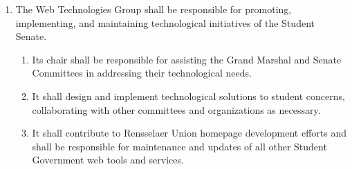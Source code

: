 \documentclass{uniondoc}
\begin{document}
\begin{enumerate}
	      \begin{enumerate}
		      \item It shall take steps to gather information on the state of quality of life, well-being, and the general campus student experience.
		            \begin{enumerate}
			            \item To this end, it shall coordinate with the Senate Communications and Engagement Committee during outreach programs to ascertain student opinions and concerns within these areas.
		            \end{enumerate}
		      \item It shall address issues pertaining to student rights and responsibilities as they arise.
		            \begin{enumerate}
			            \item It shall work with the Dean of Students to discuss pending changes to the Handbook of Student Rights and Responsibilities, or other relevant policies that affect student rights.
		            \end{enumerate}
		      \item It shall take steps to remedy student concerns regarding student life.
		            \begin{enumerate}
			            \item It shall advise the administration on issues related to student life,
			                  and work with them in addressing these issues.
			            \item It shall work and collaborate with the administration and other organizations to initiate new programs that improve the student experience.
		            \end{enumerate}
	      \end{enumerate}
	\item The Web Technologies Group shall be responsible for promoting, implementing, and maintaining technological initiatives of the Student Senate.
	      \begin{enumerate}
		      \item Its chair shall be responsible for assisting the Grand Marshal and Senate Committees in addressing their technological needs.
		      \item It shall design and implement technological solutions to student concerns, collaborating with other committees and organizations as necessary.
		      \item It shall contribute to Rensselaer Union homepage development efforts and shall be responsible for maintenance and updates of all other Student Government web tools and services.

\end{enumerate}
\end{enumerate}
\end{document}
